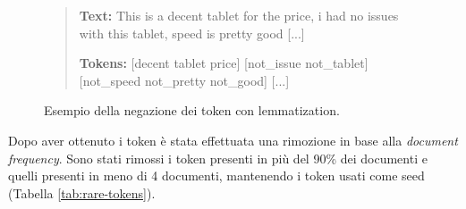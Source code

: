 \begin{figure}[ht]
    \centering
    
    \begin{quote}
    \begin{mdframed}
        \textbf{Text:} This is a decent tablet for the price, i had no issues with this tablet, speed is pretty good [...]
        
        \textbf{Tokens:}
        [decent tablet price] [not\_issue not\_tablet] [not\_speed not\_pretty not\_good] [...]
      
    \end{mdframed} 
    \end{quote}
    
    \caption{Esempio della negazione dei token con lemmatization.}
    \label{fig:tokens-example}
\end{figure}


Dopo aver ottenuto i token è stata effettuata una rimozione in base alla \textit{document frequency}.
Sono stati rimossi i token presenti in più del 90\% dei documenti e quelli presenti in meno di 4 documenti, 
mantenendo i token usati come seed (Tabella \ref{tab:rare-tokens}).

\begin{table}[ht]
\caption{Numero di token prima e dopo la rimozione in base alla \textit{document frequency} al variare della normalizzazione.}
\label{tab:rare-tokens}
\end{table}

